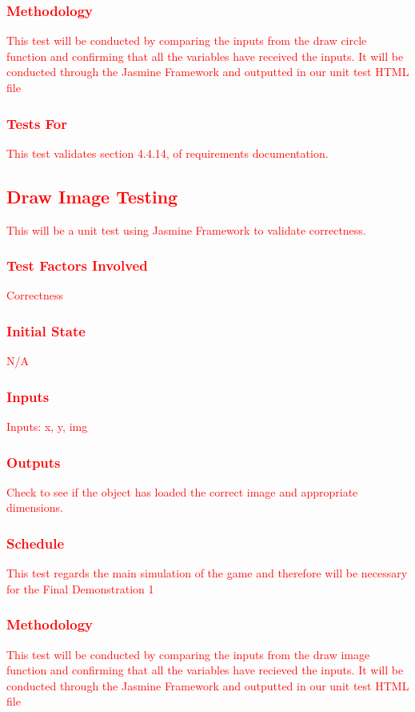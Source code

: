 \documentclass[11pt, oneside]{article}   	%
\begin{document}
\subsubsection{\textcolor{red}{Methodology}}
\textcolor{red}{This test will be conducted by comparing the inputs from the draw circle function and confirming that all the variables have received the inputs. It will be conducted through the Jasmine Framework and outputted in our unit test HTML file}
\subsubsection{\textcolor{red}{Tests For}}
\textcolor{red}{This test validates section 4.4.14, of requirements documentation.}



\subsection{\textcolor{red}{Draw Image Testing}}
\textcolor{red}{This will be a unit test using Jasmine Framework to validate correctness.}
\subsubsection{\textcolor{red}{Test Factors Involved}}
\textcolor{red}{Correctness}
\subsubsection{\textcolor{red}{Initial State}}
\textcolor{red}{N/A}
\subsubsection{\textcolor{red}{Inputs}}
\textcolor{red}{Inputs: x, y, img}
\subsubsection{\textcolor{red}{Outputs}}
\textcolor{red}{Check to see if the object has loaded the correct image and appropriate dimensions.}
\subsubsection{\textcolor{red}{Schedule}}
\textcolor{red}{This test regards the main simulation of the game and therefore will be necessary for the Final Demonstration 1}
\subsubsection{\textcolor{red}{Methodology}}
\textcolor{red}{This test will be conducted by comparing the inputs from the draw image function and confirming that all the variables have recieved the inputs. It will be conducted through the Jasmine Framework and outputted in our unit test HTML file}
\end{document}
